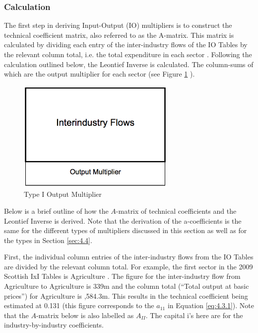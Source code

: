 \begin{doublespacing}
\subsubsection{Calculation}

The first step in deriving Input-Output (IO) multipliers is to construct the technical coefficient matrix, also referred to as the A-matrix. This matrix is calculated by dividing each entry of the inter-industry flows of the IO Tables by the relevant column total, i.e. the total expenditure in each sector \cite{Miller2009}. Following the calculation outlined below, the Leontief Inverse is calculated. The column-sums of which are the output multiplier for each sector (see Figure \ref{fig:4.3.1} ).

\bigskip

\begin{figure}[hb]
\label{fig:4.3.1}
  \centering
  \includegraphics[width=3in]{T1OutputMultiplier}
  \caption{Type I Output Multiplier}
\end{figure}

\bigskip

Below is a brief outline of how the $\textit{A}$-matrix of technical coefficients and the Leontief Inverse is derived. Note that the derivation of the a-coefficients is the same for the different types of multipliers discussed in this section as well as for the types in Section \ref{sec:4.4}.

\bigskip

First, the individual column entries of the inter-industry flows from the IO Tables are divided by the relevant column total. For example, the first sector in the 2009 Scottish IxI Tables is Agriculture \cite{ScottishGovernment2013a}. The figure for the inter-industry flow from Agriculture to Agriculture is \textsterling339m and the column total (``Total output at basic prices'') for Agriculture is ,584.3m. This results in the technical coefficient being estimated at 0.131 (this figure corresponds to the $a_{11}$ in Equation \ref{eq:4.3.1}). Note that the $\textit{A}$-matrix below is also labelled as $A_{II}$. The capital i's here are for the industry-by-industry coefficients.


\end{doublespacing}
